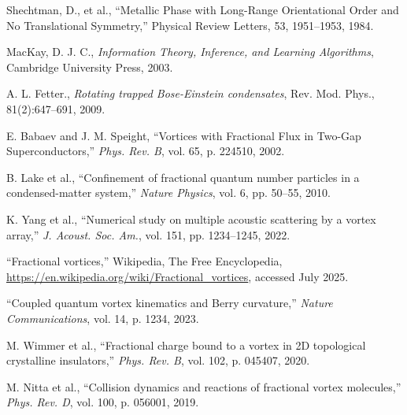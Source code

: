\begin{thebibliography}{99}
 Shechtman, D., et al., ``Metallic Phase with Long-Range Orientational Order and No Translational Symmetry,'' Physical Review Letters, 53, 1951--1953, 1984.

 MacKay, D. J. C., \emph{Information Theory, Inference, and Learning Algorithms}, Cambridge University Press, 2003.

 A. L. Fetter.,  \emph{Rotating trapped Bose-Einstein condensates}, Rev. Mod. Phys., 81(2):647--691, 2009.

 E. Babaev and J. M. Speight, ``Vortices with Fractional Flux in Two-Gap Superconductors,'' \textit{Phys. Rev. B}, vol. 65, p. 224510, 2002.

 B. Lake et al., ``Confinement of fractional quantum number particles in a condensed-matter system,'' \textit{Nature Physics}, vol. 6, pp. 50--55, 2010.

 K. Yang et al., ``Numerical study on multiple acoustic scattering by a vortex array,'' \textit{J. Acoust. Soc. Am.}, vol. 151, pp. 1234--1245, 2022.

 ``Fractional vortices,'' Wikipedia, The Free Encyclopedia, \url{https://en.wikipedia.org/wiki/Fractional_vortices}, accessed July 2025.

 ``Coupled quantum vortex kinematics and Berry curvature,'' \textit{Nature Communications}, vol. 14, p. 1234, 2023.

 M. Wimmer et al., ``Fractional charge bound to a vortex in 2D topological crystalline insulators,'' \textit{Phys. Rev. B}, vol. 102, p. 045407, 2020.

 M. Nitta et al., ``Collision dynamics and reactions of fractional vortex molecules,'' \textit{Phys. Rev. D}, vol. 100, p. 056001, 2019.

\end{thebibliography}
